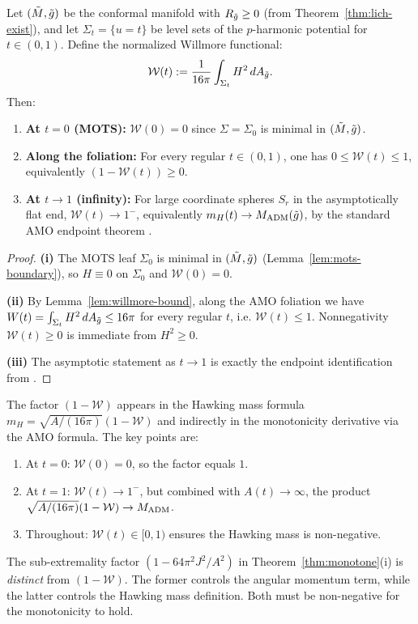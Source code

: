 \begin{lemma}\label{lem:willmore-factor-bound}
Let $(\tilde{M}, \tilde{g})$ be the conformal manifold with $R_{\tilde{g}} \geq 0$ (from Theorem~\ref{thm:lich-exist}), and let $\Sigma_t = \{u = t\}$ be level sets of the $p$-harmonic potential for $t \in (0,1)$. Define the normalized Willmore functional:
\[
\mathcal{W}(t) := \frac{1}{16\pi}\int_{\Sigma_t} H^2 \, dA_{\tilde{g}}.
\]
Then:
\begin{enumerate}[label=\textup{(\roman*)}]
    \item \textbf{At $t = 0$ (MOTS):} $\mathcal{W}(0) = 0$ since $\Sigma = \Sigma_0$ is minimal in $(\tilde{M}, \tilde{g})$.
    \item \textbf{Along the foliation:} For every regular $t\in(0,1)$, one has $0\le \mathcal{W}(t)\le 1$, equivalently $(1-\mathcal{W}(t))\ge 0$.
    \item \textbf{At $t\to 1$ (infinity):} For large coordinate spheres $S_r$ in the asymptotically flat end,
    $\mathcal{W}(t) \to 1^-$, equivalently $m_H(t)\to M_{\mathrm{ADM}}(\tilde{g})$, by the standard AMO endpoint theorem \cite[Theorem~1.3]{amo2022}.
\end{enumerate}
\end{lemma}
\begin{proof}
\textbf{(i)} The MOTS leaf $\Sigma_0$ is minimal in $(\tilde{M},\tilde{g})$ (Lemma~\ref{lem:mots-boundary}), so $H\equiv 0$ on $\Sigma_0$ and $\mathcal{W}(0)=0$.

\textbf{(ii)} By Lemma~\ref{lem:willmore-bound}, along the AMO foliation we have
$W(t)=\int_{\Sigma_t}H^2\,dA_{\tilde{g}}\le 16\pi$ for every regular $t$, i.e. $\mathcal{W}(t)\le 1$. Nonnegativity $\mathcal{W}(t)\ge 0$ is immediate from $H^2\ge 0$.

\textbf{(iii)} The asymptotic statement as $t\to 1$ is exactly the endpoint identification from \cite[Theorem~1.3]{amo2022}.
\end{proof}

\begin{remark}\label{rem:willmore-role}
The factor $(1-\mathcal{W})$ appears in the Hawking mass formula $m_H = \sqrt{A/(16\pi)}(1-\mathcal{W})$ and indirectly in the monotonicity derivative via the AMO formula. The key points are:
\begin{enumerate}
    \item At $t = 0$: $\mathcal{W}(0) = 0$, so the factor equals $1$.
    \item At $t = 1$: $\mathcal{W}(t) \to 1^-$, but combined with $A(t) \to \infty$, the product $\sqrt{A/(16\pi)}(1-\mathcal{W}) \to M_{\mathrm{ADM}}$.
    \item Throughout: $\mathcal{W}(t) \in [0, 1)$ ensures the Hawking mass is non-negative.
\end{enumerate}
The sub-extremality factor $(1 - 64\pi^2 J^2/A^2)$ in Theorem~\ref{thm:monotone}(i) is \emph{distinct} from $(1-\mathcal{W})$. The former controls the angular momentum term, while the latter controls the Hawking mass definition. Both must be non-negative for the monotonicity to hold.
\end{remark}

